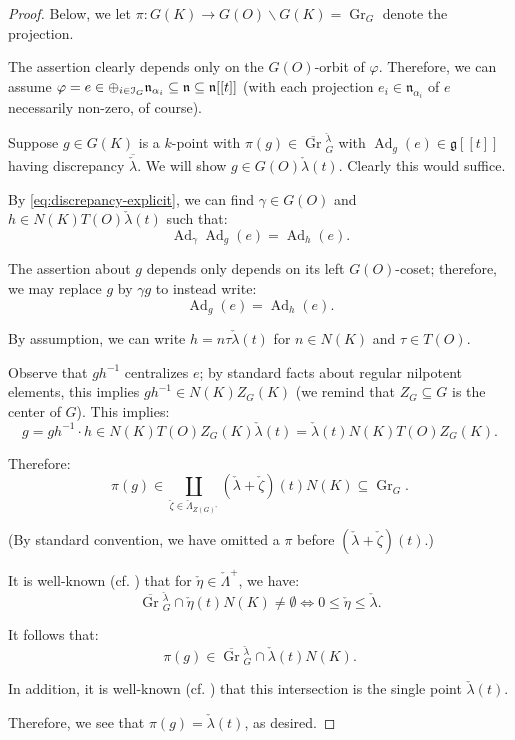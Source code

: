 \documentclass[reqno,11pt]{amsart}
\numberwithin{equation}{subsection}
\theoremstyle{remark}
\newcommand{\sI}{{\EuScript I}}
\newcommand{\fg}{{\mathfrak g}}
\newcommand{\fn}{{\mathfrak n}}
\newcommand{\on}{\operatorname}
\newcommand{\ol}[1]{\overline{#1}{}}
\newcommand{\Ad}{\on{Ad}}
\newcommand{\vph}{\varphi}
\newcommand{\Gr}{\on{Gr}}
\renewcommand{\subset}{\subseteq}
\begin{document}
\begin{proof}

Below, we let $\pi:G(K) \to G(O)\backslash G(K) = \Gr_G$ denote the projection.

The assertion clearly depends only on the $G(O)$-orbit of $\vph$.
Therefore, we can assume $\vph = e \in \oplus_{i \in \sI_G} \fn_{\alpha_i} \subset
\fn \subset \fn[[t]]$
(with each projection $e_i \in \fn_{\alpha_i}$ of $e$ necessarily non-zero, of course). 

Suppose $g \in G(K)$ is a $k$-point with $\pi(g) \in \ol{\Gr}_G^{\check{\lambda}}$ 
with $\Ad_g(e) \in \fg[[t]]$ having discrepancy $\ol{\check{\lambda}}$.
We will show
$g \in G(O)\check{\lambda}(t)$. Clearly this would suffice. 

By \eqref{eq:discrepancy-explicit}, we can find $\gamma \in G(O)$
and $h \in N(K)T(O)\check{\lambda}(t)$ such that:
%
\[
\Ad_{\gamma}\Ad_g(e) = \Ad_h(e).
\]

The assertion about $g$ depends only depends on its left $G(O)$-coset;
therefore, we may replace $g$ by $\gamma g$ to instead write:
%
\[
\Ad_g(e) = \Ad_h(e).
\]

By assumption, we can write $h = n \tau\check{\lambda}(t)$ for $n \in N(K)$
and $\tau \in T(O)$. 

Observe that $g h^{-1}$ centralizes $e$; by standard facts about 
regular nilpotent elements, this implies $g h^{-1} \in N(K)Z_G(K)$ (we remind
that $Z_G \subset G$ is the center of $G$).
This implies:
%
\[
g = gh^{-1}\cdot h \in N(K)T(O)Z_G(K) \check{\lambda}(t) = 
 \check{\lambda}(t)N(K)T(O)Z_G(K).
\]

\noindent Therefore:
%
\[
\pi(g) \in \coprod_{\check{\zeta} \in \check{\Lambda}_{Z(G)^{\circ}}} 
(\check{\lambda}+\check{\zeta})(t)N(K) \subset \Gr_G.
\]

\noindent (By standard convention, we have omitted a $\pi$ before 
$(\check{\lambda}+\check{\zeta})(t)$.)

It is well-known (cf. \cite{mirkovic-vilonen}) 
that for $\check{\eta} \in \check{\Lambda}^+$, we 
have:
%
\[
\ol{\Gr}_G^{\check{\lambda}} \cap \check{\eta}(t) N(K) \neq \emptyset
\Leftrightarrow 0 \leq \check{\eta} \leq \check{\lambda}.
\]

It follows that:
%
\[
\pi(g) \in \ol{\Gr}_G^{\check{\lambda}} \cap \check{\lambda}(t) N(K).
\]

\noindent In addition, it is well-known (cf. \cite{mirkovic-vilonen}) that
this intersection is the single point $\check{\lambda}(t)$.

Therefore, we see that $\pi(g) = \check{\lambda}(t)$, as desired.

\end{proof}
\end{document}
